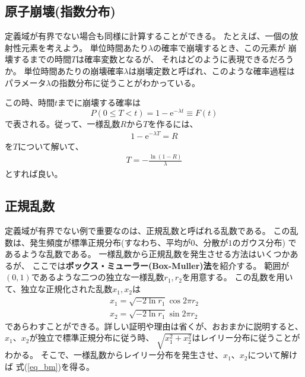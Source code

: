 \documentclass{jarticle}
\begin{document}
\subsection{原子崩壊(指数分布)}

定義域が有界でない場合も同様に計算することができる。
たとえば、一個の放射性元素を考えよう。
単位時間あたり$\lambda$の確率で崩壊するとき、この元素が
崩壊するまでの時間$T$は確率変数となるが、
それはどのように表現できるだろうか。
単位時間あたりの崩壊確率$\lambda$は崩壊定数と呼ばれ、このような確率過程は
パラメータ$\lambda$の指数分布に従うことがわかっている。

この時、時間$t$までに崩壊する確率は
\begin{equation}
P(0 \le T < t) = 1 - \mathrm{e}^{-\lambda t} \equiv F(t)
\end{equation}
で表される。従って、一様乱数$R$から$T$を作るには、
\begin{eqnarray}
1 - \mathrm{e}^{-\lambda T} = R
\end{eqnarray}
を$T$について解いて、
\begin{eqnarray}
T = - \frac{\ln (1-R)}{\lambda}
\end{eqnarray}
とすれば良い。

\subsection{正規乱数}

定義域が有界でない例で重要なのは、正規乱数と呼ばれる乱数である。
この乱数は、発生頻度が標準正規分布(すなわち、平均が$0$、分散が$1$のガウス分布)
であるような乱数である。
一様乱数から正規乱数を発生させる方法はいくつかあるが、
ここでは{\bf ボックス・ミューラー(Box-Muller)法}を紹介する。
範囲が$(0,1)$であるような二つの独立な一様乱数$r_1, r_2$を用意する。
この乱数を用いて、独立な正規化された乱数$x_1, x_2$は
\begin{equation}
\begin{array}{l}
x_1 = \sqrt{-2\ln r_1} \cos 2\pi r_2\\
x_2 = \sqrt{-2\ln r_1} \sin 2\pi r_2
\end{array} \label{eq_bm}
\end{equation}
であらわすことができる。詳しい証明や理由は省くが、おおまかに説明すると、
$x_1$、$x_2$が独立で標準正規分布に従う時、
$\sqrt{x_1^2+x_2^2}$はレイリー分布に従うことがわかる。
そこで、一様乱数からレイリー分布を発生させ、$x_1$、$x_2$について解けば
式(\ref{eq_bm})を得る。
\end{document}
